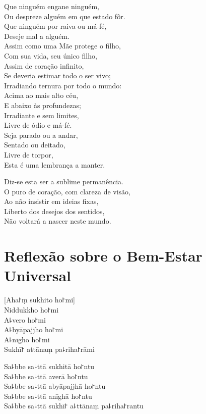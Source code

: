 \documentclass[
  babelLanguage=english,
  final,
  webversion,
]{chantingbook}
\begin{document}
\clearpage

Que ninguém engane ninguém,\\
Ou despreze alguém em que estado fôr.\\
Que ninguém por raiva ou má-fé,\\
Deseje mal a alguém.\\
Assim como uma Mãe protege o filho,\\
Com sua vida, seu único filho,\\
Assim de coração infinito,\\
Se deveria estimar todo o ser vivo;\\
Irradiando ternura por todo o mundo:\\
Acima ao mais alto céu,\\
E abaixo às profundezas;\\
Irradiante e sem limites,\\
Livre de ódio e má-fé.\\
Seja parado ou a andar,\\
Sentado ou deitado,\\
Livre de torpor,\\
Esta é uma lembrança a manter.

Diz-se esta ser a sublime permanência.\\
O puro de coração, com clareza de visão,\\
Ao não insistir em ideias fixas,\\
Liberto dos desejos dos sentidos,\\
Não voltará a nascer neste mundo.

\chapter*[Bem-Estar Universal]{Reflexão sobre o Bem-Estar Universal}

\delegateSetUseNext


\begin{leader}
\end{leader}

[Aha꜓ṃ sukhito ho꜓mi]\\
Niddukkho ho꜓mi\\
A꜕vero ho꜓mi\\
A꜕byāpajjho ho꜓mi\\
A꜕nīgho ho꜓mi\\
Sukhī꜓ attānaṃ pa꜕riha꜓rāmi

Sa꜕bbe sa꜕ttā sukhitā ho꜓ntu\\
Sa꜕bbe sa꜕ttā averā ho꜓ntu\\
Sa꜕bbe sa꜕ttā abyāpajjhā ho꜓ntu\\
Sa꜕bbe sa꜕ttā anīghā ho꜓ntu\\
Sa꜕bbe sa꜕ttā sukhī꜓ a꜕ttānaṃ pa꜕riha꜓rantu
\end{document}
